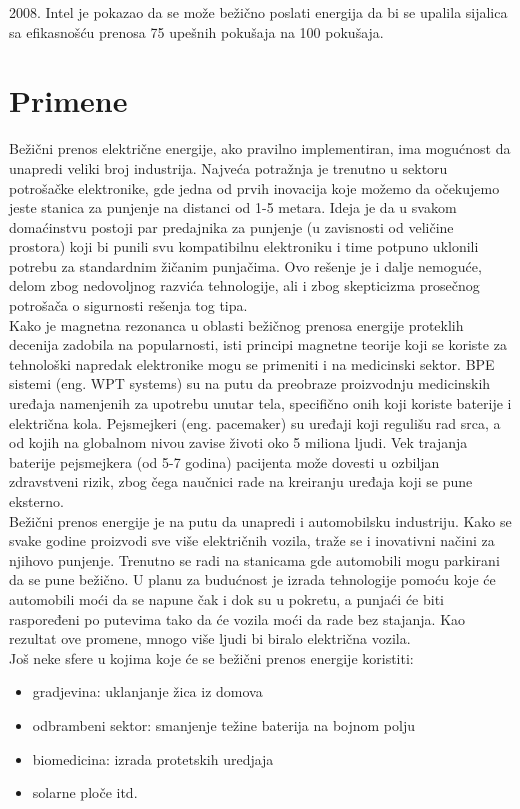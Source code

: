 \documentclass[a4paper]{article}
\begin{document}
2008. Intel je pokazao da se može bežično poslati energija da bi se upalila sijalica sa efikasnošću prenosa 75 upešnih pokušaja na 100 pokušaja.



\section{Primene}
\label{sec:Primene}
Bežični prenos električne energije, ako pravilno implementiran, ima mogućnost da unapredi veliki broj industrija. Najveća potražnja je trenutno u sektoru potrošačke elektronike, gde jedna od prvih inovacija koje možemo da očekujemo jeste stanica za punjenje na distanci od 1-5 metara. \cite{a} Ideja je da u svakom domaćinstvu postoji par predajnika za punjenje (u zavisnosti od veličine prostora) koji bi punili svu kompatibilnu elektroniku i time potpuno uklonili potrebu za standardnim žičanim punjačima. Ovo rešenje je i dalje nemoguće, delom zbog nedovoljnog razvića tehnologije, ali i zbog skepticizma prosečnog potrošača o sigurnosti rešenja tog tipa. 
\\[10pt]
Kako je magnetna rezonanca u oblasti bežičnog prenosa energije proteklih decenija zadobila na popularnosti, isti principi magnetne teorije koji se koriste za tehnološki napredak elektronike mogu se primeniti i na medicinski sektor. \cite{b} BPE sistemi (eng. WPT systems) su na putu da preobraze proizvodnju medicinskih uređaja namenjenih za upotrebu unutar tela, specifično onih koji koriste baterije i električna kola. Pejsmejkeri (eng. pacemaker) su uređaji koji regulišu rad srca, a od kojih na globalnom nivou zavise životi oko 5 miliona ljudi. Vek trajanja baterije pejsmejkera (od 5-7 godina) \cite{c} pacijenta može dovesti u ozbiljan zdravstveni rizik, zbog čega naučnici rade na kreiranju uređaja koji se pune eksterno. 
\\[10pt]
Bežični prenos energije je na putu da unapredi i automobilsku industriju. Kako se svake godine proizvodi sve više električnih vozila, traže se i inovativni načini za njihovo punjenje. Trenutno se radi na stanicama gde automobili mogu parkirani da se pune bežično. U planu za budućnost je izrada tehnologije pomoću koje će automobili moći da se napune čak i dok su u pokretu, a punjaći će biti raspoređeni po putevima tako da će vozila moći da rade bez stajanja. Kao rezultat ove promene, mnogo više ljudi bi biralo električna vozila. 
\\[10pt]
Još neke sfere u kojima koje će se bežični prenos energije koristiti:
\begin{itemize}
 \item gradjevina: uklanjanje žica iz domova
 \item odbrambeni sektor: smanjenje težine baterija na bojnom polju
 \item biomedicina: izrada protetskih uredjaja
 \item solarne ploče itd.
\end{itemize}
\end{document}
